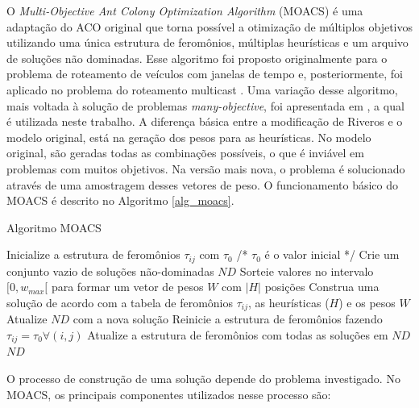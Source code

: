 O \textit{Multi-Objective Ant Colony Optimization Algorithm} (MOACS) \cite{Baran2003} é uma adaptação do ACO original que torna possível a otimização de múltiplos objetivos utilizando uma única estrutura de feromônios, múltiplas heurísticas e um arquivo de soluções não dominadas. Esse algoritmo foi proposto originalmente para o problema de roteamento de veículos com janelas de tempo e, posteriormente, foi aplicado no problema do roteamento multicast \cite{Pinto2005}. Uma variação desse algoritmo, mais voltada à solução de problemas \textit{many-objective}, foi apresentada em \cite{Riveros2016}, a qual é utilizada neste trabalho. A diferença básica entre a modificação de Riveros e o modelo original, está na geração dos pesos para as heurísticas. No modelo original, são geradas todas as combinações possíveis, o que é inviável em problemas com muitos objetivos. Na versão mais nova, o problema é solucionado através de uma amostragem desses vetores de peso. O funcionamento básico do MOACS é descrito no Algoritmo \ref{alg_moacs}.

\begin{algorithm}
	\caption{Algoritmo MOACS}
	\label{alg_moacs}
	\begin{algorithmic}[1]
		\State Inicialize a estrutura de feromônios $\tau_{ij}$ com $\tau_0$ /* $\tau_{0}$ é o valor inicial */
		\State Crie um conjunto vazio de soluções não-dominadas $ND$
		\State Sorteie valores no intervalo $[0, w_{max}[$ para formar um vetor de pesos $W$ com $|H|$ posições
		\State Construa uma solução de acordo com a tabela de feromônios $\tau_{ij}$, as heurísticas ($H$) e os pesos $W$
		\State Atualize $ND$ com a nova solução
		\EndFor
		\State Reinicie a estrutura de feromônios fazendo $\tau_{ij} = \tau_0 \forall(i,j)$
		\Else
		\State Atualize a estrutura de feromônios com todas as soluções em $ND$
		\EndIf
		\EndWhile
		\State \Return $ND$
	\end{algorithmic}
\end{algorithm}

O processo de construção de uma solução depende do problema investigado. No MOACS, os principais componentes utilizados nesse processo são:

